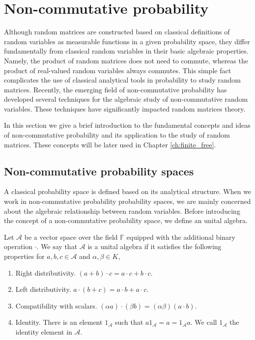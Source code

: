 \section{Non-commutative probability}

Although random matrices are constructed based on classical definitions of random variables as measurable functions in a given probability space, they differ fundamentally from classical random variables in their basic algebraic properties. Namely, the product of random matrices does not need to commute, whereas the product of real-valued random variables always commutes. This simple fact complicates the use of classical analytical tools in probability to study random matrices. Recently, the emerging field of non-commutative probability has developed several techniques for the algebraic study of non-commutative random variables. These techniques have significantly impacted random matrices theory.

In this section we give a brief introduction to the fundamental concepts and ideas of non-commutative probability and its application to the study of random matrices. These concepts will be later used in Chapter \ref{ch:finite_free}.

\subsection{Non-commutative probability spaces}

A classical probability space is defined based on its analytical structure. When we work in non-commutative probability probability spaces, we are mainly concerned about the algebraic relationship between random variables. Before introducing the concept of a non-commutative probability space, we define an unital algebra.

\begin{definition}
    Let $\mathcal A$ be a vector space over the field $\mathbb F$ equipped with the additional binary operation $\cdot$. We say that $\mathcal A$ is a unital algebra if it satisfies the following properties for $a,b,c \in \mathcal A$ and $\alpha, \beta \in K$,

    \begin{enumerate}
        \item Right distributivity. $(a + b) \cdot c = a\cdot c + b \cdot c$.
        \item Left distributivity. $a\cdot(b + c) = a\cdot b + a \cdot c$.
        \item Compatibility with scalars. $(\alpha a)\cdot(\beta b) = (\alpha \beta)(a\cdot b)$.
        \item Identity. There is an element $1_{\mathcal A}$ such that $a 1_{\mathcal A} = a = 1_{\mathcal A} a$. We call $1_{\mathcal A}$ the identity element in $\mathcal A$.
    \end{enumerate}

\end{definition}

